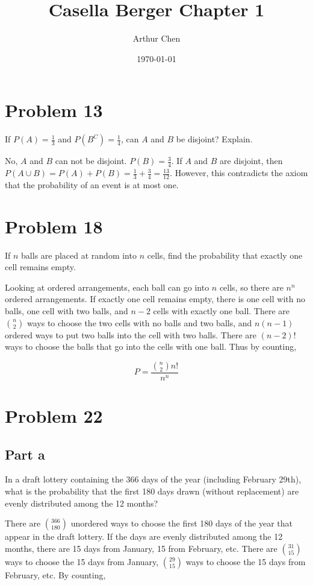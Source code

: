 \documentclass{article}
\author{Arthur Chen}
\title{Casella Berger Chapter 1}
\date{\today}
\begin{document}
\maketitle

\section*{Problem 13}

If $P(A) = \frac{1}{3}$ and $P(B^C) = \frac{1}{4}$, can $A$ and $B$ be disjoint? Explain.

No, $A$ and $B$ can not be disjoint. $P(B) = \frac{3}{4}$. If $A$ and $B$ are disjoint, then $P(A \cup B) = P(A) + P(B) = \frac{1}{3} + \frac{3}{4} = \frac{13}{12}$. However, this contradicts the axiom that the probability of an event is at most one.

\section*{Problem 18}

If $n$ balls are placed at random into $n$ cells, find the probability that exactly one cell remains empty.

Looking at ordered arrangements, each ball can go into $n$ cells, so there are $n^n$ ordered arrangements. If exactly one cell remains empty, there is one cell with no balls, one cell with two balls, and $n-2$ cells with exactly one ball. There are $\binom{n}{2}$ ways to choose the two cells with no balls and two balls, and $n(n-1)$ ordered ways to put two balls into the cell with two balls. There are $(n-2)!$ ways to choose the balls that go into the cells with one ball. Thus by counting,

\[
P = \frac{\binom{n}{2} n!}{n^n}
\]

\section*{Problem 22}

\subsection*{Part a}

In a draft lottery containing the 366 days of the year (including February 29th), what is the probability that the first 180 days drawn (without replacement) are evenly distributed among the 12 months?

There are $\binom{366}{180}$ unordered ways to choose the first 180 days of the year that appear in the draft lottery. If the days are evenly distributed among the 12 months, there are 15 days from January, 15 from February, etc. There are $\binom{31}{15}$ ways to choose the 15 days from January, $\binom{29}{15}$ ways to choose the 15 days from February, etc. By counting,
\end{document}
